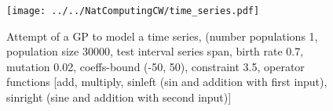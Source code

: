 \documentclass[11pt,a4paper]{article}
\begin{document}
\begin{appendices}
\begin{figure}[h]
\centering
\texttt{[image: ../../NatComputingCW/time\_series.pdf]} 
\caption{Attempt of a GP to model a time series, (number populations 1, population size 30000, test interval series span, birth rate 0.7, mutation 0.02, coeffs-bound (-50, 50), constraint 3.5, operator functions [add, multiply, sinleft (sin and addition with first input), sinright (sine and addition with second input)]}
\label{fig:tim_ser}
\end{figure}

\end{appendices}
\end{document}
